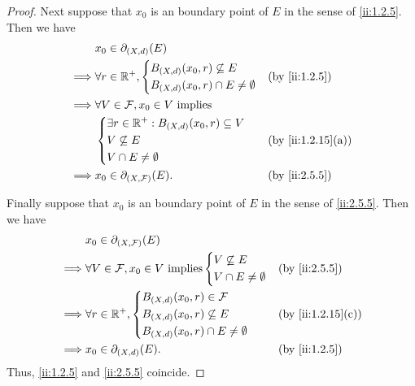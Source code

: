 \begin{proof}
  Next suppose that \(x_0\) is an boundary point of \(E\) in the sense of \cref{ii:1.2.5}.
  Then we have
  \begin{align*}
             & x_0 \in \partial_{(X, d)}(E)                                              \\
    \implies & \forall r \in \R^+, \begin{dcases}
                                     B_{(X, d)}(x_0, r) \not\subseteq E \\
                                     B_{(X, d)}(x_0, r) \cap E \neq \emptyset
                                   \end{dcases}               &  & \by{ii:1.2.5}         \\
    \implies & \forall V \in \mathcal{F}, x_0 \in V \text{ implies}                      \\
             & \begin{dcases}
                 \exists r \in \R^+ : B_{(X, d)}(x_0, r) \subseteq V \\
                 V \not\subseteq E                                   \\
                 V \cap E \neq \emptyset
               \end{dcases} &  & \by{ii:1.2.15}[a]                       \\
    \implies & x_0 \in \partial_{(X, \mathcal{F})}(E).                &  & \by{ii:2.5.5}
  \end{align*}

  Finally suppose that \(x_0\) is an boundary point of \(E\) in the sense of \cref{ii:2.5.5}.
  Then we have
  \begin{align*}
             & x_0 \in \partial_{(X, \mathcal{F})}(E)                                                 \\
    \implies & \forall V \in \mathcal{F}, x_0 \in V \text{ implies} \begin{dcases}
                                                                      V \not\subseteq E \\
                                                                      V \cap E \neq \emptyset
                                                                    \end{dcases} &  & \by{ii:2.5.5}   \\
    \implies & \forall r \in \R^+, \begin{dcases}
                                     B_{(X, d)}(x_0, r) \in \mathcal{F} \\
                                     B_{(X, d)}(x_0, r) \not\subseteq E \\
                                     B_{(X, d)}(x_0, r) \cap E \neq \emptyset
                                   \end{dcases}                            &  & \by{ii:1.2.15}[c]     \\
    \implies & x_0 \in \partial_{(X, d)}(E).                                       &  & \by{ii:1.2.5}
  \end{align*}
  Thus, \cref{ii:1.2.5} and \cref{ii:2.5.5} coincide.
\end{proof}

